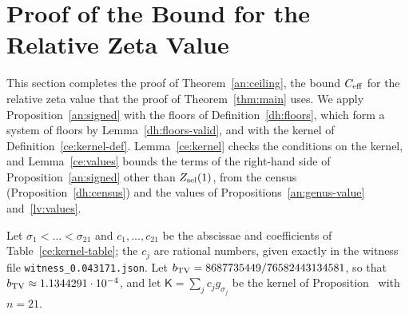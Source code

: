 \section{Proof of the Bound for the Relative Zeta Value}\label{ce:section}

This section completes the proof of Theorem~\ref{an:ceiling}, the bound
$C_{\rm eff}$ for the relative zeta value that the proof of
Theorem~\ref{thm:main} uses. We apply Proposition~\ref{an:signed} with the
floors of Definition~\ref{dh:floors}, which form a system of floors by
Lemma~\ref{dh:floors-valid}, and with the kernel of
Definition~\ref{ce:kernel-def}. Lemma~\ref{ce:kernel} checks the conditions
on the kernel, and Lemma~\ref{ce:values} bounds the terms of the right-hand
side of Proposition~\ref{an:signed} other than $Z_{\rm sel}(1)$, from the census (Proposition~\ref{dh:census})
and the values of Propositions~\ref{an:genus-value} and~\ref{lv:values}.

\begin{definition}\label{ce:kernel-def}
Let $\sigma_1<\dots<\sigma_{21}$ and $c_1,\dots,c_{21}$ be the abscissae and
coefficients of Table~\ref{ce:kernel-table}; the $c_j$ are rational numbers,
given exactly in the witness file \texttt{witness\_0.043171.json}.
Let $b_{\rm TV}=8687735449/76582443134581$, so that
$b_{\rm TV}\approx1.1344291\cdot10^{-4}$, and let
$\mathsf K=\sum_jc_jg_{\sigma_j}$ be the kernel of
Proposition~ with $n=21$.
\end{definition}

